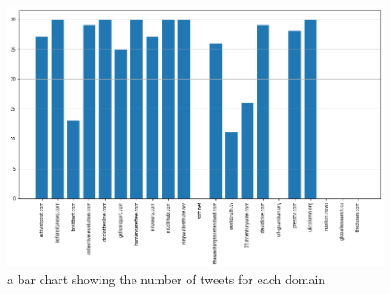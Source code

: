 \documentclass[12pt]{article}
\begin{document}
\subsection*{\color{blue}{Answer}}


\begin{figure}[H]
            \centering
            \includegraphics[trim=0 0 0 0, clip, width=\textwidth] {barchar3.png}
            \caption{ a bar chart showing the number of tweets for each domain}
            \label{fig:Q2Ans}
        \end{figure}
\end{document}
